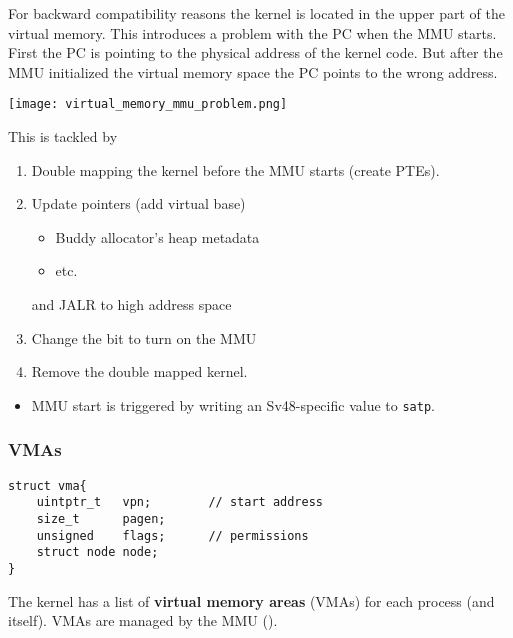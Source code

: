 For backward compatibility reasons the kernel is located in the upper part of the virtual memory. This introduces a problem with the PC when the MMU starts. First the PC is pointing to the physical address of the kernel code. But after the MMU initialized the virtual memory space the PC points to the wrong address.

\begin{center}
    \texttt{[image: virtual\_memory\_mmu\_problem.png]}
\end{center}

This is tackled by
\begin{enumerate}
    \item Double mapping the kernel before the MMU starts (create PTEs).
    \item Update pointers (add virtual base)
          \begin{itemize}
              \item Buddy allocator's heap metadata
              \item {} etc.\
          \end{itemize}
          and JALR to high address space
    \item Change the  bit to turn on the MMU
    \item Remove the double mapped kernel.
\end{enumerate}

\newpar{}
\begin{itemize}
    \item MMU start is triggered by writing an Sv48-specific value to \texttt{satp}.
\end{itemize}

\subsubsection{VMAs}
\ptitle{Data Structure}
\begin{lstlisting}[style=bright_C++]
struct vma{
    uintptr_t   vpn;        // start address
    size_t      pagen;
    unsigned    flags;      // permissions
    struct node node;
}
\end{lstlisting}

The kernel has a list of \textbf{virtual memory areas} (VMAs) for each process (and itself). VMAs are managed by the MMU ().


